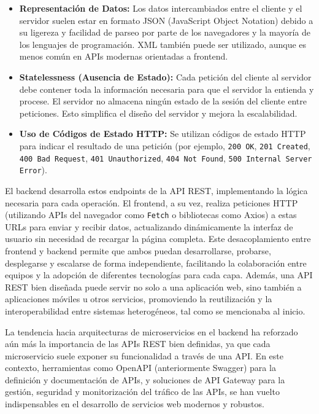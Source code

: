 \begin{itemize}
\begin{itemize}
    \end{itemize}
    \item \textbf{Representaci\'{o}n de Datos:} Los datos intercambiados entre el cliente y el servidor suelen estar en formato JSON (JavaScript Object Notation) debido a su ligereza y facilidad de parseo por parte de los navegadores y la mayor\'{i}a de los lenguajes de programaci\'{o}n. XML tambi\'{e}n puede ser utilizado, aunque es menos com\'{u}n en APIs modernas orientadas a frontend.
    \item \textbf{Statelessness (Ausencia de Estado):} Cada petici\'{o}n del cliente al servidor debe contener toda la informaci\'{o}n necesaria para que el servidor la entienda y procese. El servidor no almacena ning\'{u}n estado de la sesi\'{o}n del cliente entre peticiones. Esto simplifica el dise\~{n}o del servidor y mejora la escalabilidad.
    \item \textbf{Uso de C\'{o}digos de Estado HTTP:} Se utilizan c\'{o}digos de estado HTTP para indicar el resultado de una petici\'{o}n (por ejemplo, \texttt{200 OK}, \texttt{201 Created}, \texttt{400 Bad Request}, \texttt{401 Unauthorized}, \texttt{404 Not Found}, \texttt{500 Internal Server Error}).
\end{itemize}

El backend desarrolla estos endpoints de la API REST, implementando la l\'{o}gica necesaria para cada operaci\'{o}n. El frontend, a su vez, realiza peticiones HTTP (utilizando APIs del navegador como \texttt{Fetch} o bibliotecas como Axios) a estas URLs para enviar y recibir datos, actualizando din\'{a}micamente la interfaz de usuario sin necesidad de recargar la p\'{a}gina completa. Este desacoplamiento entre frontend y backend permite que ambos puedan desarrollarse, probarse, desplegarse y escalarse de forma independiente, facilitando la colaboraci\'{o}n entre equipos y la adopci\'{o}n de diferentes tecnolog\'{i}as para cada capa. Adem\'{a}s, una API REST bien dise\~{n}ada puede servir no solo a una aplicaci\'{o}n web, sino tambi\'{e}n a aplicaciones m\'{o}viles u otros servicios, promoviendo la reutilizaci\'{o}n y la interoperabilidad entre sistemas heterog\'{e}neos, tal como se mencionaba al inicio.

La tendencia hacia arquitecturas de microservicios en el backend ha reforzado a\'{u}n m\'{a}s la importancia de las APIs REST bien definidas, ya que cada microservicio suele exponer su funcionalidad a trav\'{e}s de una API. En este contexto, herramientas como OpenAPI (anteriormente Swagger) para la definici\'{o}n y documentaci\'{o}n de APIs, y soluciones de API Gateway para la gesti\'{o}n, seguridad y monitorizaci\'{o}n del tr\'{a}fico de las APIs, se han vuelto indispensables en el desarrollo de servicios web modernos y robustos.

